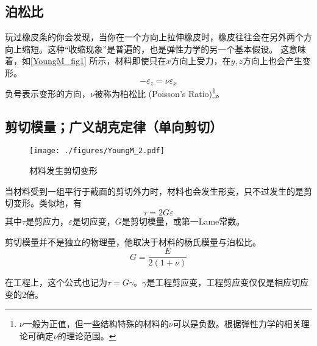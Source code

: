 \subsection{泊松比}
玩过橡皮条的你会发现，当你在一个方向上拉伸橡皮时，橡皮往往会在另外两个方向上缩短。这种“收缩现象”是普遍的，也是弹性力学的另一个基本假设。%
这意味着，如\autoref{YoungM_fig1} 所示，材料即使只在$x$方向上受力，在$y,z$方向上也会产生变形。
\begin{equation}
-\varepsilon_z= \nu \varepsilon_x
\end{equation}
负号表示变形的方向，$\nu$被称为柏松比 (Poisson's Ratio)\footnote{$\nu$一般为正值，但一些结构特殊的材料的$\nu$可以是负数。根据弹性力学的相关理论可确定$\nu$的理论范围。}。%

\subsection{剪切模量；广义胡克定律（单向剪切）}
\begin{figure}[ht]
\centering
\texttt{[image: ./figures/YoungM\_2.pdf]}
\caption{材料发生剪切变形} \label{YoungM_fig2}
\end{figure}
当材料受到一组平行于截面的剪切外力时，材料也会发生形变，只不过发生的是剪切变形。类似地，有
\begin{equation}
\tau=2G\varepsilon
\end{equation}
其中$\tau$是剪应力，$\varepsilon$是切应变，$G$是剪切模量，或第一Lame常数。

剪切模量并不是独立的物理量，他取决于材料的杨氏模量与泊松比。
\begin{equation}
G = \frac{E}{2(1+\nu)}
\end{equation}

在工程上，这个公式也记为$\tau=G\gamma$。$\gamma$是工程剪应变，工程剪应变仅仅是相应切应变的$2$倍。

